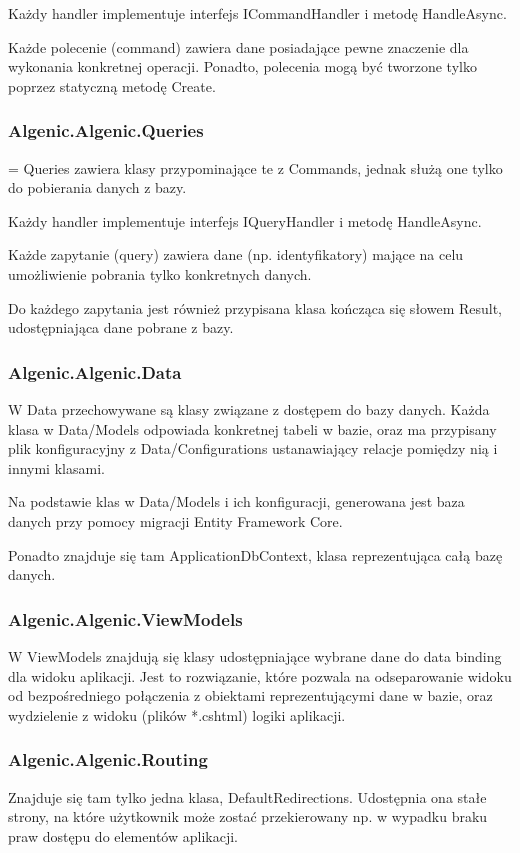 \documentclass{article}
\begin{document}
Każdy handler implementuje interfejs ICommandHandler i metodę HandleAsync.

Każde polecenie (command) zawiera dane posiadające pewne znaczenie dla wykonania konkretnej operacji. Ponadto, polecenia mogą być tworzone tylko poprzez statyczną metodę Create.
\subsubsection{Algenic.Algenic.Queries}
= Queries zawiera klasy przypominające te z Commands, jednak służą one tylko do pobierania danych z bazy.

Każdy handler implementuje interfejs IQueryHandler i metodę HandleAsync.

Każde zapytanie (query) zawiera dane (np. identyfikatory) mające na celu umożliwienie pobrania tylko konkretnych danych.

Do każdego zapytania jest również przypisana klasa kończąca się słowem Result, udostępniająca dane pobrane z bazy.
\subsubsection{Algenic.Algenic.Data}
W Data przechowywane są klasy związane z dostępem do bazy danych. Każda klasa w Data/Models odpowiada konkretnej tabeli w bazie, oraz ma przypisany plik konfiguracyjny z Data/Configurations ustanawiający relacje pomiędzy nią i innymi klasami.

Na podstawie klas w Data/Models i ich konfiguracji, generowana jest baza danych przy pomocy migracji Entity Framework Core.

Ponadto znajduje się tam ApplicationDbContext, klasa reprezentująca całą bazę danych.
\subsubsection{Algenic.Algenic.ViewModels}
W ViewModels znajdują się klasy udostępniające wybrane dane do data binding dla widoku aplikacji. Jest to rozwiązanie, które pozwala na odseparowanie widoku od bezpośredniego połączenia z obiektami reprezentującymi dane w bazie, oraz wydzielenie z widoku (plików *.cshtml) logiki aplikacji.
\subsubsection{Algenic.Algenic.Routing}
Znajduje się tam tylko jedna klasa, DefaultRedirections. Udostępnia ona stałe strony, na które użytkownik może zostać przekierowany np. w wypadku braku praw dostępu do elementów aplikacji.
\end{document}
